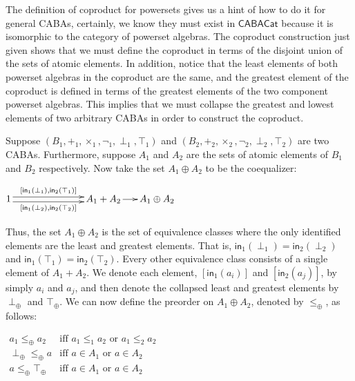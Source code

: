 \documentclass{article}
\newcommand{\CABAC}[0]{\mathsf{CABACat}}
\newcommand{\inO}[1]{\mathsf{in}_1(#1)}
\newcommand{\inT}[1]{\mathsf{in}_2(#1)}
\begin{document}
The definition of coproduct for powersets gives us a hint of how to do
it for general CABAs, certainly, we know they must exist in $\CABAC$
because it is isomorphic to the category of powerset algebras.  The
coproduct construction just given shows that we must define the
coproduct in terms of the disjoint union of the sets of atomic
elements. In addition, notice that the least elements of both powerset
algebras in the coproduct are the same, and the greatest element of
the coproduct is defined in terms of the greatest elements of the two
component powerset algebras.  This implies that we must collapse the
greatest and lowest elements of two arbitrary CABAs in order to
construct the coproduct.  

Suppose $(B_1,+_1,\times_1,\lnot_1,\perp_1,\top_1)$ and
$(B_2,+_2,\times_2,\lnot_2,\perp_2,\top_2)$ are two CABAs.
Furthermore, suppose $A_1$ and $A_2$ are the sets of atomic elements
of $B_1$ and $B_2$ respectively.  Now take the set $A_1 \oplus A_2$ to
be the coequalizer:
\begin{center}
  \begin{math}
    1 \two^{[\inO{\perp_1},\inT{\top_1}]}_{[\inO{\perp_2},\inT{\top_2}]} A_1 + A_2 \to A_1 \oplus A_2
  \end{math}
\end{center}
Thus, the set $A_1 \oplus A_2$ is the set of equivalence classes where
the only identified elements are the least and greatest elements.
That is, $\inO{\perp_1} = \inT{\perp_2}$ and $\inO{\top_1} =
\inT{\top_2}$.  Every other equivalence class consists of a single
element of $A_1 + A_2$.  We denote each element, $[\inO{a_i}]$ and
$[\inT{a_j}]$, by simply $a_i$ and $a_j$, and then denote the
collapsed least and greatest elements by $\perp_\oplus$ and
$\top_\oplus$.  We can now define the preorder on $A_1 \oplus A_2$,
denoted by $\leq_\oplus$, as follows:
\begin{center}
  \begin{math}
    \begin{array}{lll}
      a_1 \leq_\oplus a_2 & \text{iff } a_1 \leq_1 a_2 \text{ or } a_1 \leq_2 a_2\\
      \perp_\oplus \leq_\oplus a & \text{iff } a \in A_1 \text{ or } a \in A_2\\
      a \leq_\oplus \top_\oplus & \text{iff } a \in A_1 \text{ or } a \in A_2\\
    \end{array}
  \end{math}
\end{center}
\end{document}
